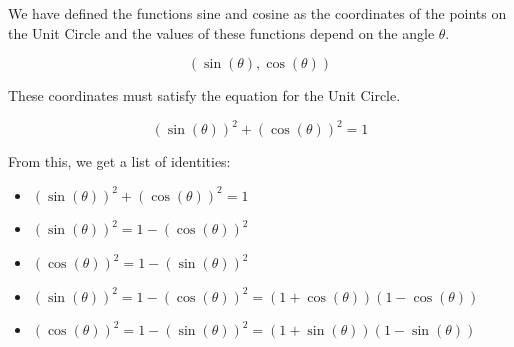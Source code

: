 \documentclass{ximera}
\begin{document}
We have defined the functions sine and cosine as the coordinates of the points on the Unit Circle and the values of these functions depend on the angle $\theta$.

\[    ( \sin(\theta), \cos(\theta) ) \]


These coordinates must satisfy the equation for the Unit Circle. 



\[    ( \sin(\theta) )^2 + ( \cos(\theta) )^2 = 1 \]



From this, we get a list of identities:



\begin{observation}


\begin{itemize}
\item $( \sin(\theta) )^2 + ( \cos(\theta) )^2 = 1$
\item $( \sin(\theta) )^2 =  1 - ( \cos(\theta) )^2$
\item $( \cos(\theta) )^2 =  1 - ( \sin(\theta) )^2$
\item $( \sin(\theta) )^2 =  1 - ( \cos(\theta) )^2 = (1 + \cos(\theta))(1 - \cos(\theta))$
\item $( \cos(\theta) )^2 =  1 - ( \sin(\theta) )^2 = (1 + \sin(\theta))(1 - \sin(\theta))$
\end{itemize}


\end{observation}
\end{document}
